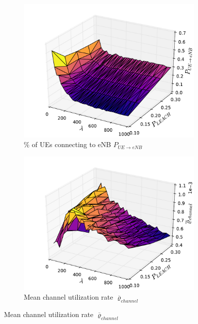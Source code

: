\begin{figure}
  \begin{subfigure}[b]{0.5\linewidth}
    \centering
    \captionsetup{justification=centering}
    \includegraphics[width=1\linewidth]{figures/LEACH_2} 
    \caption{\% of UEs connecting to eNB $P_{UE\rightarrow eNB}$ }
    \label{fig:LEACH_2} 
    \vspace{4ex}
  \end{subfigure}%
  \begin{subfigure}[b]{0.5\linewidth}
    \centering
    \captionsetup{justification=centering}
    \includegraphics[width=1\linewidth]{figures/LEACH_8} 
    \caption{Mean channel utilization rate $\overline{\varrho}_{channel}$} 

\end{subfigure}
\end{figure}
